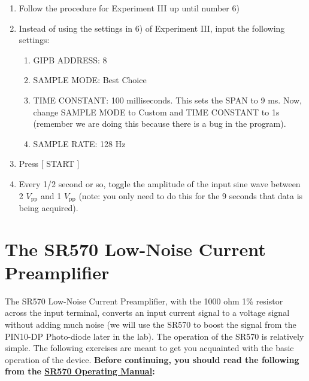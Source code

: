 \documentclass{../lab}
\begin{document}
\begin{enumerate}
    \item Follow the procedure for Experiment III up until number 6)

    \item Instead of using the settings in 6) of Experiment III, input the following settings:
    \begin{enumerate}
        \item GIPB ADDRESS: 8

        \item SAMPLE MODE: Best Choice

        \item TIME CONSTANT: 100 milliseconds. This sets the SPAN to 9 ms. Now, change SAMPLE MODE to Custom and TIME CONSTANT to 1s (remember we are doing this because there is a bug in the program).

        \item SAMPLE RATE: 128 Hz

    \end{enumerate}

    \item Press [ START ]

    \item Every 1/2 second or so, toggle the amplitude of the input sine wave between 2 $V_\text{pp}$ and 1 $V_\text{pp}$ (note: you only need to do this for the 9 seconds that data is being acquired).

\end{enumerate}


\section{The SR570 Low-Noise Current Preamplifier}

The SR570 Low-Noise Current Preamplifier, with the 1000 ohm 1\% resistor across the input terminal, converts an input current signal to a voltage signal without adding much noise (we will use the SR570 to boost the signal from the PIN10-DP Photo-diode later in the lab). The operation of the SR570 is relatively simple. The following exercises are meant to get you acquainted with the basic operation of the device. \textbf{Before continuing, you should read the following from the \href{https://drive.google.com/file/d/13_Stzrxt9jcWLl1jAA6dzxwV33Tsb9Cl/view?usp=drive_link}{SR570 Operating Manual}:}
\end{document}
